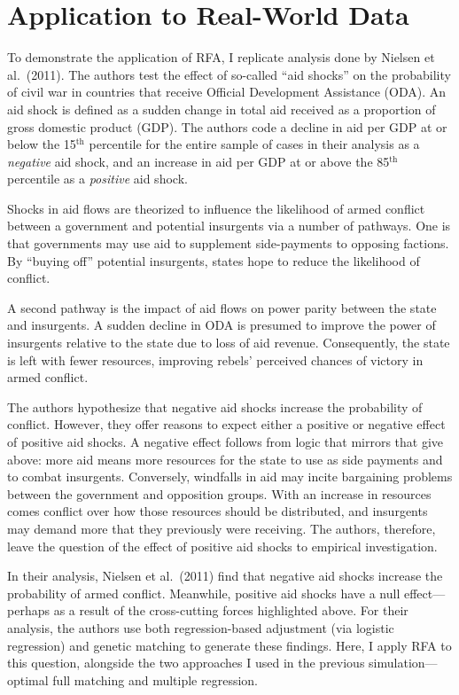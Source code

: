 \documentclass[11pt,]{article}
\begin{document}
\hypertarget{application-to-real-world-data}{%
\section{Application to Real-World
Data}\label{application-to-real-world-data}}

To demonstrate the application of RFA, I replicate analysis done by
Nielsen et al.~(2011). The authors test the effect of so-called ``aid
shocks'' on the probability of civil war in countries that receive
Official Development Assistance (ODA). An aid shock is defined as a
sudden change in total aid received as a proportion of gross domestic
product (GDP). The authors code a decline in aid per GDP at or below the
15\(^\text{th}\) percentile for the entire sample of cases in their
analysis as a \emph{negative} aid shock, and an increase in aid per GDP
at or above the 85\(^\text{th}\) percentile as a \emph{positive} aid
shock.

Shocks in aid flows are theorized to influence the likelihood of armed
conflict between a government and potential insurgents via a number of
pathways. One is that governments may use aid to supplement
side-payments to opposing factions. By ``buying off'' potential
insurgents, states hope to reduce the likelihood of conflict.

A second pathway is the impact of aid flows on power parity between the
state and insurgents. A sudden decline in ODA is presumed to improve the
power of insurgents relative to the state due to loss of aid revenue.
Consequently, the state is left with fewer resources, improving rebels'
perceived chances of victory in armed conflict.

The authors hypothesize that negative aid shocks increase the
probability of conflict. However, they offer reasons to expect either a
positive or negative effect of positive aid shocks. A negative effect
follows from logic that mirrors that give above: more aid means more
resources for the state to use as side payments and to combat
insurgents. Conversely, windfalls in aid may incite bargaining problems
between the government and opposition groups. With an increase in
resources comes conflict over how those resources should be distributed,
and insurgents may demand more that they previously were receiving. The
authors, therefore, leave the question of the effect of positive aid
shocks to empirical investigation.

In their analysis, Nielsen et al.~(2011) find that negative aid shocks
increase the probability of armed conflict. Meanwhile, positive aid
shocks have a null effect---perhaps as a result of the cross-cutting
forces highlighted above. For their analysis, the authors use both
regression-based adjustment (via logistic regression) and genetic
matching to generate these findings. Here, I apply RFA to this question,
alongside the two approaches I used in the previous simulation---optimal
full matching and multiple regression.
\end{document}
